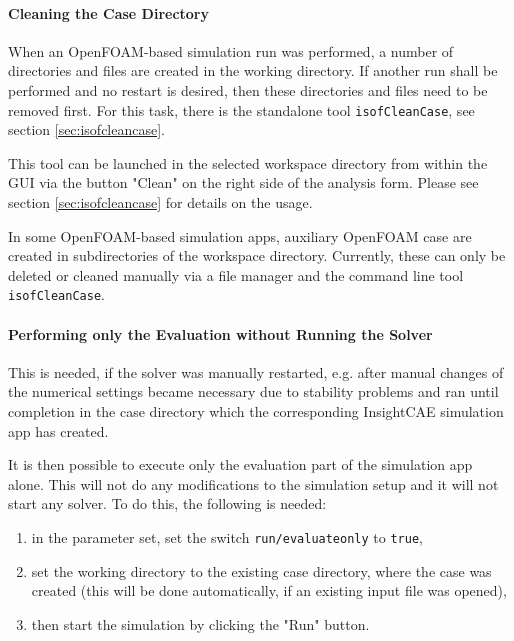 \paragraph{Cleaning the Case Directory}
\label{sec:cleancase}

When an OpenFOAM-based simulation run was performed, a number of directories and files are created in the working directory.
If another run shall be performed and no restart is desired, then these directories and files need to be removed first.
For this task, there is the standalone tool \texttt{isofCleanCase}, see section \ref{sec:isofcleancase}.

This tool can be launched in the selected workspace directory from within the GUI via the button "Clean" on the right side of the analysis form. Please see section \ref{sec:isofcleancase} for details on the usage.

In some OpenFOAM-based simulation apps, auxiliary OpenFOAM case are created in subdirectories of the workspace directory.
Currently, these can only be deleted or cleaned manually via a file manager and the command line tool \texttt{isofCleanCase}.



\paragraph{Performing only the Evaluation without Running the Solver}
\label{sec:evaluateonly_workbench}

This is needed, if the solver was manually restarted, e.g. after manual changes of the numerical settings became necessary due to stability problems and ran until completion in the case directory which the corresponding InsightCAE simulation app has created.

It is then possible to execute only the evaluation part of the simulation app alone.
This will not do any modifications to the simulation setup and it will not start any solver.
To do this, the following is needed:
\begin{enumerate}
\item in the parameter set, set the switch \texttt{run/evaluateonly} to \texttt{true},
\item set the working directory to the existing case directory, where the case was created (this will be done automatically, if an existing input file was opened),
\item then start the simulation by clicking the "Run" button.
\end{enumerate}

